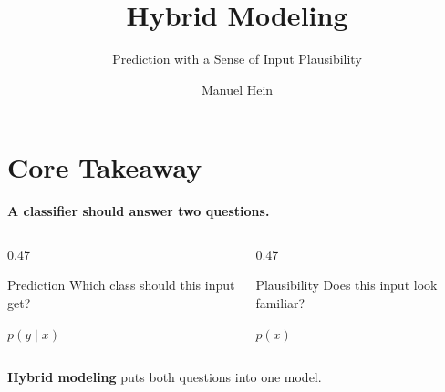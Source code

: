 \documentclass[fleqn,compress,utf8,aspectratio=169,t]{beamer}
\title[Hybrid Modeling]{Hybrid Modeling}
\subtitle{Prediction with a Sense of Input Plausibility}
\author[M. Hein]{Manuel Hein}
\institute[LMU]{LMU Munich\\MA Seminar: Recent Advances in Machine Learning}
\makeatletter
\newcommand{\mainclaim}[1]{%
  {\Large\bfseries #1\par}
}
\newcommand{\keyword}[1]{\textbf{\color{lmu@green}#1}}
\makeatother
\begin{document}
\maketitle


\section{Core Takeaway}
\begin{frame}
  \vspace{0.65cm}
  \mainclaim{A classifier should answer two questions.}

  \vspace{0.8cm}
  \begin{columns}[T,totalwidth=\textwidth]
    \begin{column}{0.47\textwidth}
      \begin{block}{Prediction}
        \centering
        Which class should this input get?

        \vspace{0.35cm}
        {\Large \(p(y\mid x)\)}
      \end{block}
    \end{column}
    \begin{column}{0.47\textwidth}
      \begin{block}{Plausibility}
        \centering
        Does this input look familiar?

        \vspace{0.35cm}
        {\Large \(p(x)\)}
      \end{block}
    \end{column}
  \end{columns}

  \vspace{0.5cm}
  \centering
  \keyword{Hybrid modeling} puts both questions into one model.
\end{frame}

\end{document}
